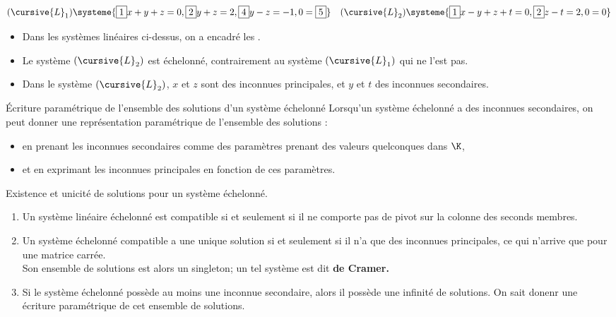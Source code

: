\documentclass[11pt]{article}
\begin{document}
\begin{ex}{}{}
    \begin{equation*}
        (\cursive{L}_1)\systeme{
            \boxed{1}x+y+z=0,
            \boxed{2}y+z=2,
            \boxed{4}y-z=-1,
            0=\boxed{5}
        } \quad (\cursive{L}_2) \systeme{
            \boxed{1}x - y + z + t =0,
            \boxed{2}z - t = 2,
            0=0
        }
    \end{equation*}
    \begin{itemize}
        \item Dans les systèmes linéaires ci-dessus, on a encadré les .
        \item Le système $(\cursive{L}_2)$ est échelonné, contrairement au système $(\cursive{L}_1)$ qui ne l'est pas.
        \item Dans le système $(\cursive{L}_2)$, $x$ et $z$ sont des inconnues principales, et $y$ et $t$ des inconnues secondaires.
    \end{itemize}
\end{ex}

\begin{meth}{Écriture paramétrique de l'ensemble des solutions d'un système échelonné}{}
    Lorsqu'un système échelonné a des inconnues secondaires, on peut donner une représentation paramétrique de l'ensemble des solutions :
    \begin{itemize}
        \item en prenant les inconnues secondaires comme des paramètres prenant des valeurs quelconques dans $\K$,
        \item et en exprimant les inconnues principales en fonction de ces paramètres.
    \end{itemize}
\end{meth}

\begin{prop}{Existence et unicité de solutions pour un système échelonné.}{}
    \begin{enumerate}
        \item Un système linéaire échelonné est compatible si et seulement si il ne comporte pas de pivot sur la colonne des seconds membres.
        \item Un système échelonné compatible a une unique solution si et seulement si il n'a que des inconnues principales, ce qui n'arrive que pour une matrice carrée.\\
        Son ensemble de solutions est alors un singleton; un tel système est dit \bf{de Cramer}.
        \item Si le système échelonné possède au moins une inconnue secondaire, alors il possède une infinité de solutions. On sait donenr une écriture paramétrique de cet ensemble de solutions.
    \end{enumerate}
\end{prop}
\end{document}
